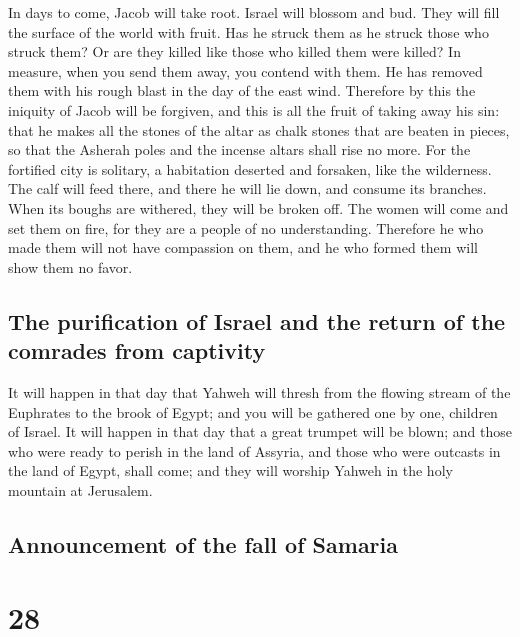  In days to come, Jacob will take root. Israel will
blossom and bud. They will fill the surface of the world with fruit.
 Has he struck them as he struck those who struck them? Or
are they killed like those who killed them were killed? 
In measure, when you send them away, you contend with them. He has
removed them with his rough blast in the day of the east wind.
 Therefore by this the iniquity of Jacob will be forgiven,
and this is all the fruit of taking away his sin: that he makes all the
stones of the altar as chalk stones that are beaten in pieces, so that
the Asherah poles and the incense altars shall rise no more.
 For the fortified city is solitary, a habitation
deserted and forsaken, like the wilderness. The calf will feed there,
and there he will lie down, and consume its branches. 
When its boughs are withered, they will be broken off. The women will
come and set them on fire, for they are a people of no understanding.
Therefore he who made them will not have compassion on them, and he who
formed them will show them no favor.

\hypertarget{the-purification-of-israel-and-the-return-of-the-comrades-from-captivity}{%
\subsection{The purification of Israel and the return of the comrades
from
captivity}\label{the-purification-of-israel-and-the-return-of-the-comrades-from-captivity}}

 It will happen in that day that Yahweh will thresh from
the flowing stream of the Euphrates to the brook of Egypt; and you will
be gathered one by one, children of Israel.  It will
happen in that day that a great trumpet will be blown; and those who
were ready to perish in the land of Assyria, and those who were outcasts
in the land of Egypt, shall come; and they will worship Yahweh in the
holy mountain at Jerusalem.

\hypertarget{announcement-of-the-fall-of-samaria}{%
\subsection{Announcement of the fall of
Samaria}\label{announcement-of-the-fall-of-samaria}}

\hypertarget{section-27}{%
\section{28}\label{section-27}}

